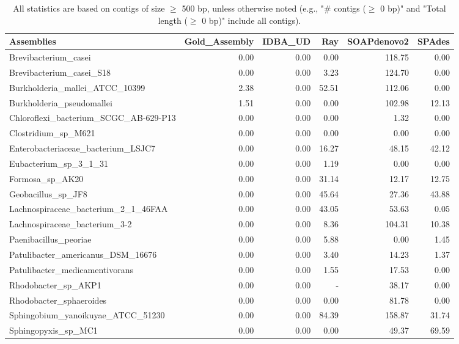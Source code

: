 \documentclass[12pt,a4paper]{article}
\begin{document}
\begin{table}[ht]
\begin{center}
\caption{All statistics are based on contigs of size $\geq$ 500 bp, unless otherwise noted (e.g., "\# contigs ($\geq$ 0 bp)" and "Total length ($\geq$ 0 bp)" include all contigs).}
\begin{tabular}{|l*{5}{|r}|}
\hline
Assemblies & Gold\_Assembly & IDBA\_UD & Ray & SOAPdenovo2 & SPAdes \\ \hline
Brevibacterium\_casei & 0.00 & 0.00 & 0.00 & 118.75 & 0.00 \\ \hline
Brevibacterium\_casei\_S18 & 0.00 & 0.00 & 3.23 & 124.70 & 0.00 \\ \hline
Burkholderia\_mallei\_ATCC\_10399 & 2.38 & 0.00 & 52.51 & 112.06 & 0.00 \\ \hline
Burkholderia\_pseudomallei & 1.51 & 0.00 & 0.00 & 102.98 & 12.13 \\ \hline
Chloroflexi\_bacterium\_SCGC\_AB-629-P13 & 0.00 & 0.00 & 0.00 & 1.32 & 0.00 \\ \hline
Clostridium\_sp\_M621 & 0.00 & 0.00 & 0.00 & 0.00 & 0.00 \\ \hline
Enterobacteriaceae\_bacterium\_LSJC7 & 0.00 & 0.00 & 16.27 & 48.15 & 42.12 \\ \hline
Eubacterium\_sp\_3\_1\_31 & 0.00 & 0.00 & 1.19 & 0.00 & 0.00 \\ \hline
Formosa\_sp\_AK20 & 0.00 & 0.00 & 31.14 & 12.17 & 12.75 \\ \hline
Geobacillus\_sp\_JF8 & 0.00 & 0.00 & 45.64 & 27.36 & 43.88 \\ \hline
Lachnospiraceae\_bacterium\_2\_1\_46FAA & 0.00 & 0.00 & 43.05 & 53.63 & 0.05 \\ \hline
Lachnospiraceae\_bacterium\_3-2 & 0.00 & 0.00 & 8.36 & 104.31 & 10.38 \\ \hline
Paenibacillus\_peoriae & 0.00 & 0.00 & 5.88 & 0.00 & 1.45 \\ \hline
Patulibacter\_americanus\_DSM\_16676 & 0.00 & 0.00 & 3.40 & 14.23 & 1.37 \\ \hline
Patulibacter\_medicamentivorans & 0.00 & 0.00 & 1.55 & 17.53 & 0.00 \\ \hline
Rhodobacter\_sp\_AKP1 & 0.00 & 0.00 & - & 38.17 & 0.00 \\ \hline
Rhodobacter\_sphaeroides & 0.00 & 0.00 & 0.00 & 81.78 & 0.00 \\ \hline
Sphingobium\_yanoikuyae\_ATCC\_51230 & 0.00 & 0.00 & 84.39 & 158.87 & 31.74 \\ \hline
Sphingopyxis\_sp\_MC1 & 0.00 & 0.00 & 0.00 & 49.37 & 69.59 \\ \hline

\end{tabular}
\end{center}
\end{table}
\end{document}
